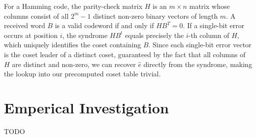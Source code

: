 \documentclass{article}
\begin{document}
For a Hamming code, the parity-check matrix \(H\) is an \(m \times n\) matrix whose columns consist of all 
\(2^m - 1\) distinct non-zero binary vectors of length \(m\). A received word \(B\) is a valid 
codeword if and only if \(HB^T = 0\). If a single-bit error occurs at position \(i\), the syndrome \(HB^t\)
equals precisely the \(i\)-th column of \(H\), which uniquely identifies the coset containing \(B\). Since
each single-bit error vector is the coset leader of a distinct coset, guaranteed by the fact that all 
columns of \(H\) are distinct and non-zero, we can recover \(\hat{e}\) directly from the syndrome, making
the lookup into our precomputed coset table trivial.

\section{Emperical Investigation}
TODO
\end{document}
